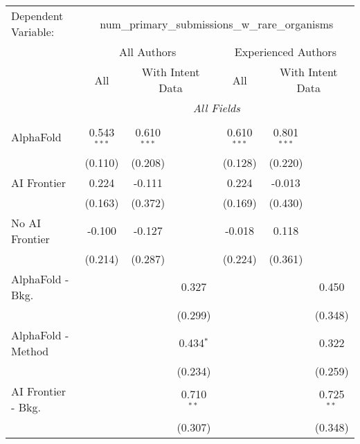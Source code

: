 \begingroup
\centering
\begin{tabular}{lcccccc}
   \tabularnewline \midrule \midrule
   Dependent Variable: & \multicolumn{6}{c}{num\_primary\_submissions\_w\_rare\_organisms}\\
 & \multicolumn{3}{c}{All Authors} & \multicolumn{3}{c}{Experienced Authors} \\
\cmidrule(lr){2-4} \cmidrule(lr){5-7}
 & \multicolumn{1}{c}{All} & \multicolumn{2}{c}{With Intent Data} & \multicolumn{1}{c}{All} & \multicolumn{2}{c}{With Intent Data} \\
\cmidrule(lr){2-2} \cmidrule(lr){3-4} \cmidrule(lr){5-5} \cmidrule(lr){6-7}
 & \multicolumn{6}{c}{\textit{All Fields}} \\ \\
   AlphaFold               & 0.543$^{***}$ & 0.610$^{***}$ &              & 0.610$^{***}$ & 0.801$^{***}$ &   \\   
                           & (0.110)       & (0.208)       &              & (0.128)       & (0.220)       &   \\   
   AI Frontier             & 0.224         & -0.111        &              & 0.224         & -0.013        &   \\   
                           & (0.163)       & (0.372)       &              & (0.169)       & (0.430)       &   \\   
   No AI Frontier          & -0.100        & -0.127        &              & -0.018        & 0.118         &   \\   
                           & (0.214)       & (0.287)       &              & (0.224)       & (0.361)       &   \\   
   AlphaFold - Bkg.        &               &               & 0.327        &               &               & 0.450\\   
                           &               &               & (0.299)      &               &               & (0.348)\\   
   AlphaFold - Method      &               &               & 0.434$^{*}$  &               &               & 0.322\\   
                           &               &               & (0.234)      &               &               & (0.259)\\   
   AI Frontier - Bkg.      &               &               & 0.710$^{**}$ &               &               & 0.725$^{**}$\\   
                           &               &               & (0.307)      &               &               & (0.348)\\   

\end{tabular}
